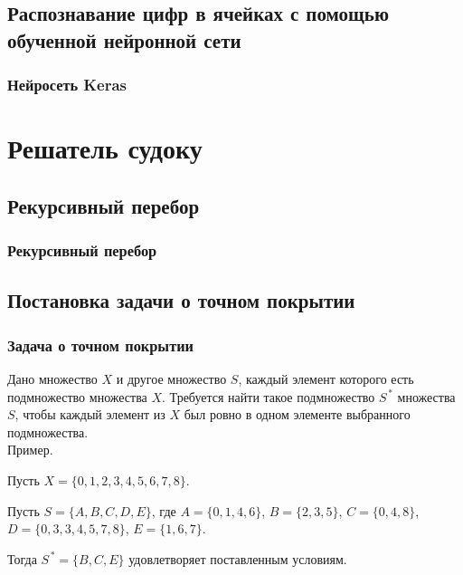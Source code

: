 \documentclass{beamer}
\begin{document}
\subsection{Распознавание цифр в ячейках с помощью обученной нейронной сети}
\begin{frame}
\frametitle{Нейросеть Keras}
\end{frame}



\section{Решатель судоку}

\subsection{Рекурсивный перебор}
\begin{frame}
\frametitle{Рекурсивный перебор}

\end{frame}




\subsection{Постановка задачи о точном покрытии}
\begin{frame}

\frametitle{Задача о точном покрытии}

Дано множество $X$ и другое множество $S$, каждый элемент которого есть подмножество множества $X$. Требуется найти такое подмножество $S^{\,*}$ множества $S$, чтобы каждый элемент из $X$ был ровно в одном элементе выбранного подмножества.\\

Пример.

Пусть $X=\{0,1,2,3,4,5,6,7,8\}$.

Пусть $S=\{A,B,C,D,E\}$, где $A=\{0,1,4,6\}$, $B=\{2,3,5\}$, $C=\{0,4,8\}$, $D=\{0,3,3,4,5,7,8\}$, $E=\{1,6,7\}$.

Тогда $S^{\,*}=\{B,C,E\}$ удовлетворяет поставленным условиям.


\end{frame}
\end{document}
